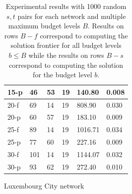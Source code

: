 \begin{table}
\begin{subtable}{.5\textwidth}
\begin{center}
\begin{tabular}{ | l | p{1cm} | p{1cm} | p{1cm} | p{1.2cm} | p{1.2cm} |}
	15-p & 46 & 53 & 19 & 140.80 & 0.008 \\ \hline
	20-f & 69 & 14 & 19 & 808.90 & 0.030 \\ 
	20-p & 60 & 57 & 19 & 183.10 & 0.009 \\ \hline
	25-f & 89 & 14 & 19 & 1016.71 & 0.034 \\ 
	25-p & 77 & 60 & 19 & 227.16 & 0.009 \\ \hline
	30-f & 101 & 14& 19 & 1144.07 & 0.032 \\ 
	30-p & 93 & 62 & 19 & 272.40 & 0.010 \\ \hline
\end{tabular}
\caption{Luxembourg City network}\label{tab:lu4k_results}
\end{center}
\end{subtable}
\caption{Experimental results with 1000 random $s,t$ pairs for each network and multiple maximum budget levels $B$. Results on rows $B-f$ correspond to computing the solution frontier for all budget levels $b\leq B$ while the results on rows $B-s$ correspond to computing the solution for the budget level $b$.}\label{tab:performance_results}
\end{table}

